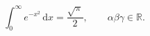 \documentclass{article}
\begin{document}
\[ \int_0^\infty e^{-x^2}\,\mathrm{d}x = \frac{\sqrt{\pi}}{2}, \qquad \alpha\beta\gamma \in \mathbb{R}. \]
\end{document}
